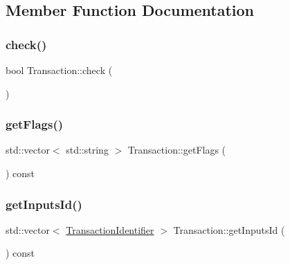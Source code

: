 \subsection{Member Function Documentation}
\mbox{\label{classTransaction_a46f1d85f39193e516f795c3afe857c90}} 
\subsubsection{\texorpdfstring{check()}{check()}}
{\footnotesize\ttfamily bool Transaction\+::check (\begin{DoxyParamCaption}{ }\end{DoxyParamCaption})}

\mbox{\label{classTransaction_ab539d43c5af22bed8985473f26e8ac20}} 
\subsubsection{\texorpdfstring{get\+Flags()}{getFlags()}}
{\footnotesize\ttfamily std\+::vector$<$ std\+::string $>$ Transaction\+::get\+Flags (\begin{DoxyParamCaption}{ }\end{DoxyParamCaption}) const}

\mbox{\label{classTransaction_a0422efb4aea64a19437c350b04f7de96}} 
\subsubsection{\texorpdfstring{get\+Inputs\+Id()}{getInputsId()}}
{\footnotesize\ttfamily std\+::vector$<$ \mbox{\hyperlink{structTransactionIdentifier}{Transaction\+Identifier}} $>$ Transaction\+::get\+Inputs\+Id (\begin{DoxyParamCaption}{ }\end{DoxyParamCaption}) const}

\mbox{\label{classTransaction_affdce860d7691f68b2e665a8f8d413fd}} 
